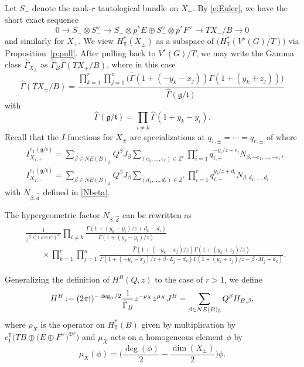 \documentclass[pdftex]{sigma}
\numberwithin{equation}{section}
\newcommand{\ZZ}{\mathbb{Z}}
\newcommand{\torus}{\mathbb{T}}
\newcommand{\F}{F}
\newcommand{\E}{E}
\newcommand{\MB}{M}
\newcommand{\LB}{L}
\newcommand{\z}{z}
\newcommand{\x}{x}
\newcommand{\y}{y}
\begin{document}
Let $S_-$ denote the rank-$r$ tautological bundle on $X_-$. By \eqref{e:Euler}, we have the short exact sequence
\[0 \to S_- \otimes S_-^\vee \to S_- \otimes p^*E \oplus S_-^\vee \otimes p^*F^\vee \to TX_-/B \to 0
\]
and similarly for $X_+$. We view $H^*_\torus(X_\pm)$ as a subspace of $\bigl(H^*_\torus( V^{s}(G)/T)\bigr)$ via Proposition~\ref{p:pull}. After pulling back to $V^s(G)/T$, we may
 write the Gamma class $\hat \Gamma_{X_\pm}$ as
$\hat \Gamma_{B} \hat \Gamma(TX_\pm/B)$, where in this case
\[
\hat \Gamma(TX_\pm/B) = \frac{\prod_{k=1}^r\prod_{j=1}^n\bigl(
\hat \Gamma(1+(- y_k-\x_j))\Gamma(1+(y_k+\z_j))\bigr)}{\hat \Gamma(\mathfrak g/\mathfrak t)}
\]
with
\[
\hat \Gamma(\mathfrak g/\mathfrak t) = \prod_{i \neq k} \hat \Gamma(1 + y_k - y_i).
\]
Recall that the $I$-functions for $X_\pm$ are specializations at $q_{1, \pm} = \cdots = q_{r, \pm}$ of \smash{$I_{X_{T, \pm}}^{e_\torus(\mathfrak g /\mathfrak t)}$} where
\begin{align*}
&I_{X_{T, +}}^{e_\torus(\mathfrak g /\mathfrak t)}=
\sum_{\beta \in NE(B)_\ZZ} Q^\beta J_\beta \sum_{(e_1, \dots, e_r) \in \ZZ^r} \prod_{i=1}^r q_{i, +}^{-\y_i/z+e_i}N_{\beta, -e_1, \dots , -e_r} ,\\
 &I_{X_{T, -}}^{e_\torus(\mathfrak g /\mathfrak t)}=
\sum_{\beta \in NE(B)_\ZZ} Q^\beta J_\beta \sum_{(d_1, \dots, d_r) \in \ZZ^r} \prod_{i=1}^r q_{i, -}^{\y_i/z+d_i}N_{\beta, d_1, \dots , d_r}
\end{align*}
with $N_{\beta,\vec{d}}$ defined in \eqref{Nbeta}.

The hypergeometric factor $N_{\beta,\vec{d}}$ can be rewritten as \begin{align*}
 &\frac{1}{z^{\beta \cdot c_1^\torus(\E \oplus \F^\vee)^{\oplus r}}}\prod_{ i\neq k}\frac{ \Gamma(1 + (\y_k - \y_i)/z + d_k - d_i) }{ \Gamma(1 + (\y_k - \y_i)/z)} \\
 &\qquad{}\times\prod_{k=1}^r\prod_{j=1}^n \frac{
\hat \Gamma(1+(- \y_k-\x_j)/z)\Gamma(1+(\y_k+\z_j)/z)}{\Gamma(1+(-\y_k-\x_j)/z+\beta\cdot \LB_j - d_k)\Gamma(1+(\y_k+\z_j)/z-\beta\cdot \MB_j + d_k)}.
\end{align*}

Generalizing the definition of $H^B(Q ,z)$ to the case of $r>1$, we define
\begin{align*} H^B := (2 \pi {\rm i})^{-\deg_0/2}\frac{1}{\hat \Gamma_B} z^{- \rho_{X}} z^{\mu_{X}} J^B
 =
\sum_{\beta \in NE(B)_\ZZ} Q^\beta H_{B, \beta},\end{align*}
where $\rho_{X}$ is the operator on $H^*_\torus(B)$ given by multiplication by $c_1^\torus\bigl(TB \oplus \bigl(E \oplus F^\vee\bigr)^{\oplus r}\bigr)$ and $\mu_X$ acts on a homogeneous element $\phi$ by
\[
\mu_{X}(\phi) = \biggl( \frac{\deg(\phi)}{2} -\frac{ \dim(X_{\pm})}{2} \biggr) \phi.
\]
\end{document}
